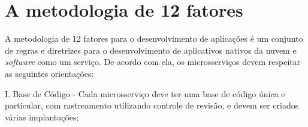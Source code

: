 \section{A metodologia de 12 fatores}

A metodologia de 12 fatores para o desenvolvimento de aplicações é um conjunto de regras e diretrizes para o desenvolvimento de aplicativos nativos da nuvem e \emph{software} como um serviço. De acordo com ela, os microsserviços devem respeitar as seguintes orientações: \cite{12factor, oracle_microservices,12fatores-rita}









I. Base de Código - Cada microsserviço deve ter uma base de código única e particular, com rastreamento utilizando controle de revisão, e devem ser criados várias implantações;

